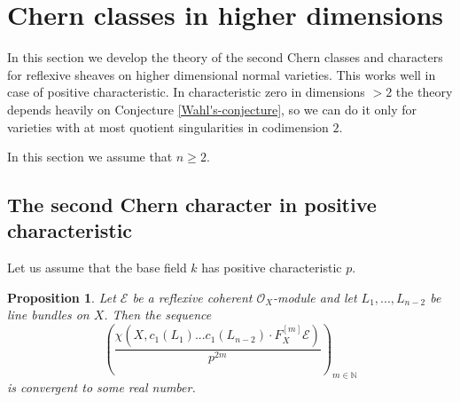 \documentclass[twoside, 11pt]{article}
\theoremstyle{plain}
\newtheorem{Proposition}[Thm]{\sc Proposition}
\theoremstyle{definition}
\theoremstyle{remark}
\newcommand{\NN}{{\mathbb N}}
\newcommand{\cE}{{\mathcal E}}
\newcommand{\cO}{{\mathcal O}}
\begin{document}
\section{Chern classes in higher dimensions}


In this section we develop the theory of  the second Chern classes and characters for
reflexive sheaves on higher dimensional normal varieties. This works well in case of positive characteristic. 
In characteristic zero in dimensions $>2$ the theory depends heavily on  Conjecture \ref{Wahl's-conjecture}, so we can do it only for varieties with at most quotient singularities in codimension $2$.


\medskip

In this section we assume that $n\ge 2$.

\subsection{The second Chern character in positive characteristic}

Let us assume that the base field $k$ has positive characteristic $p$.


\begin{Proposition}\label{existence-of-limit}
Let $\cE$ be a reflexive coherent $\cO_X$-module and let $L_1,..., L_{n-2}$ be line bundles on $X$.
Then 
the sequence $$\left(\frac {  \chi (X, c_1(L_1)...c_1(L_{n-2}) \cdot {F_X^{[m]}\cE} ) }{p^{2m}} \right)_{m\in \NN}$$
 is convergent to some real number. 
 \end{Proposition}
\end{document}
